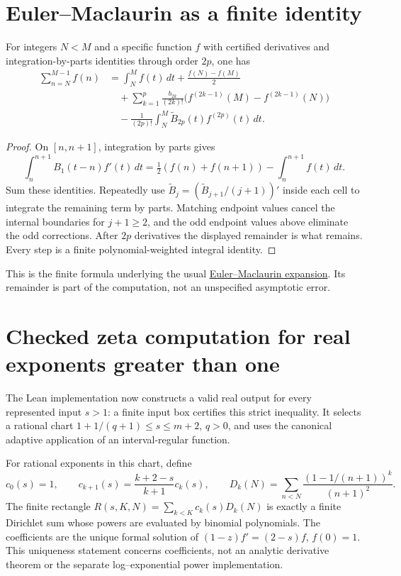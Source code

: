 \section{Euler--Maclaurin as a finite identity}
\label{thm:finite-euler-maclaurin}
For integers $N<M$ and a specific function $f$ with certified derivatives
and integration-by-parts identities through order $2p$, one has
\begin{align*}
 \sum_{n=N}^{M-1} f(n)
 &=\int_N^M f(t)\,dt+\frac{f(N)-f(M)}2\\
 &\quad+\sum_{k=1}^p\frac{b_{2k}}{(2k)!}
                \bigl(f^{(2k-1)}(M)-f^{(2k-1)}(N)\bigr)\\
 &\quad-\frac1{(2p)!}\int_N^M\widetilde B_{2p}(t)f^{(2p)}(t)\,dt.
\end{align*}
\begin{proof}
On $[n,n+1]$, integration by parts gives
\[
 \int_n^{n+1}B_1(t-n)f'(t)\,dt
       =\tfrac12(f(n)+f(n+1))-\int_n^{n+1}f(t)\,dt.
\]
Sum these identities.  Repeatedly use
$\widetilde B_j=(\widetilde B_{j+1}/(j+1))'$ inside each cell to integrate
the remaining term by parts.  Matching endpoint values cancel the internal
boundaries for $j+1\ge2$, and the odd endpoint values above eliminate the
odd corrections.  After $2p$ derivatives the displayed remainder is what
remains.  Every step is a finite polynomial-weighted integral identity.
\end{proof}

This is the finite formula underlying the usual
\href{https://dlmf.nist.gov/2.10}{Euler--Maclaurin expansion}.  Its remainder
is part of the computation, not an unspecified asymptotic error.

\section{Checked zeta computation for real exponents greater than one}
The Lean implementation now constructs a valid real output for every represented
input $s>1$: a finite input box certifies this strict inequality. It selects a
rational chart $1+1/(q+1)\le s\le m+2$, $q>0$, and uses the canonical adaptive
application of an interval-regular function.

For rational exponents in this chart, define
\[
 c_0(s)=1,\qquad c_{k+1}(s)=\frac{k+2-s}{k+1}c_k(s),\qquad
 D_k(N)=\sum_{n<N}\frac{(1-1/(n+1))^k}{(n+1)^2}.
\]
The finite rectangle $R(s,K,N)=\sum_{k<K}c_k(s)D_k(N)$ is exactly a finite
Dirichlet sum whose powers are evaluated by binomial polynomials.
The coefficients are the unique formal solution of $(1-z)f'=(2-s)f$,
$f(0)=1$. This uniqueness statement concerns coefficients, not an analytic
derivative theorem or the separate log--exponential power implementation.

